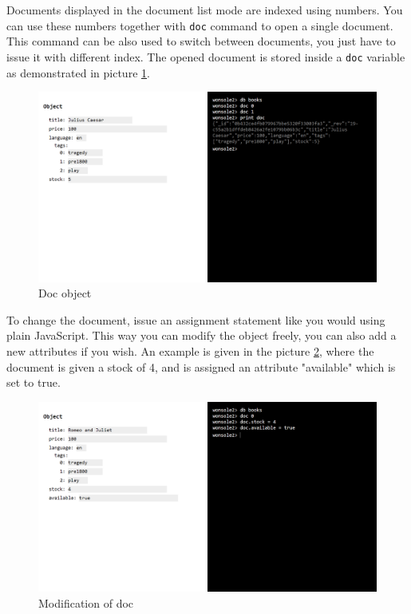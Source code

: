 Documents displayed in the document list mode are indexed using numbers. You can
use these numbers together with \verb|doc| command to open a single document.
This command can be also used to switch between documents, you just have to
issue it with different index. The opened document is stored inside a \verb|doc|
variable as demonstrated in picture \ref{wonsole2-32}.

\begin{figure}
\centering
\includegraphics[width=\textwidth]{../../manual/screenshot/wonsole2/wonsole2-32.png}
\caption{Doc object}
\label{wonsole2-32}
\end{figure}

To change the document, issue an assignment statement like you would using plain JavaScript. This way you can modify
the object freely, you can also add a new attributes if you wish. An example is given in the picture
\ref{wonsole2-38}, where the document is given a stock of 4, and is assigned an attribute "available" which is set to true.


\begin{figure}
\centering
\includegraphics[width=\textwidth]{../../manual/screenshot/wonsole2/wonsole2-38.png}
\caption{Modification of doc}
\label{wonsole2-38}
\end{figure}



